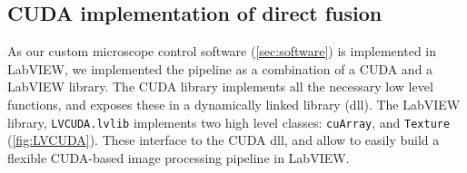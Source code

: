 
\subsection{CUDA implementation of direct fusion}
  As our custom microscope control software (\autoref{sec:software}) is implemented in LabVIEW, we implemented the pipeline as a combination of a CUDA and a LabVIEW library. The CUDA library implements all the necessary low level functions, and exposes these in a dynamically linked library (dll). The LabVIEW library, \texttt{LVCUDA.lvlib} implements two high level classes: \texttt{cuArray}, and \texttt{Texture} (\autoref{fig:LVCUDA}). These interface to the CUDA dll, and allow to easily build a flexible CUDA-based image processing pipeline in LabVIEW.

